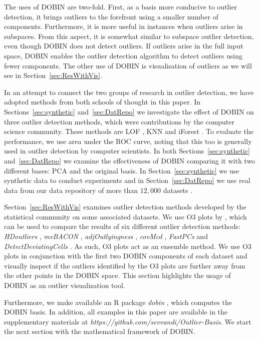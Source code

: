 \documentclass[a4paper,11pt]{article}
\begin{document}
The uses of DOBIN are two-fold. First, as a basis more conducive to outlier detection, it brings outliers to the forefront using a smaller number of components. Furthermore, it is more useful in instances when outliers arise  in subspaces. From this aspect, it is somewhat similar to subspace outlier detection, even though DOBIN does not detect outliers.  If outliers arise in the full input space,  DOBIN  enables the outlier detection algorithm to detect outliers using fewer components. The other use of DOBIN is  visualisation of outliers as we will see in Section~\ref{sec:ResWithVis}.

In an attempt to connect the two groups of research in outlier detection, we have adopted methods from both schools of thought in this paper. In Sections~\ref{sec:synthetic} and~\ref{sec:DatRepo} we investigate the effect of DOBIN on three outlier detection methods, which were contributions by the computer science community. These methods are LOF \citep{breunig2000lof}, KNN \citep{ramaswamy2000efficient} and iForest \citep{liu2008isolation}. To evaluate the performance, we use  area under the ROC curve, noting that this too is generally used in outlier detection by computer scientists. In both Sections~\ref{sec:synthetic} and~\ref{sec:DatRepo} we examine the effectiveness of DOBIN comparing it with two different bases: PCA and the original basis.  In Section~\ref{sec:synthetic} we use synthetic data to conduct experiments  and in Section~\ref{sec:DatRepo} we use real data from our data repository of more than $12,000$ datasets \citep{datasets}.

Section~\ref{sec:ResWithVis} examines outlier detection methods developed by the statistical community on some associated datasets. We use O3 plots by  \cite{unwin2019multivariate}, which can be used to compare the results of six different outlier detection methods: \textit{HDoutliers} \citep{wilkinson2017visualizing}, \textit{mvBACON} \citep{billor2000bacon},  \textit{adjOutlyingness} \citep{brys2005robustification}, \textit{covMcd} \citep{rousseeuw1999fast} , \textit{FastPCs} \citep{vakili2014finding} and \textit{DetectDeviatingCells} \citep{rousseeuw2018detecting}. As such, O3 plots act as an ensemble method. We use O3 plots in conjunction with the first two DOBIN components of each dataset and visually inspect if the outliers identified by the O3 plots are further away from the other points in the DOBIN space. This section highlights the usage of DOBIN as an outlier visualization tool.

Furthermore, we make available an R package \textit{dobin} \citep{dobin}, which computes the DOBIN basis. In addition, all examples in this paper are available in the supplementary materials at \textit{https://github.com/sevvandi/Outlier-Basis}.  We start the next section  with the mathematical framework of DOBIN. %
\end{document}
